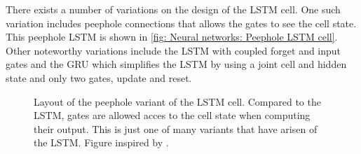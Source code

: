 There exists a number of variations on the design of the \gls{LSTM} cell. One such variation includes peephole connections \cite{Gers2000} that allows the gates to see the cell state. This peephole \gls{LSTM} is shown in \autoref{fig: Neural networks: Peephole LSTM cell}. Other noteworthy variations include the \gls{LSTM} with coupled forget and input gates and the \gls{GRU} \cite{Cho2014a} which simplifies the \gls{LSTM} by using a joint cell and hidden state and only two gates, update and reset.
\begin{figure}[tbp!]
    \centering
    
    \caption{Layout of the peephole variant of the \gls{LSTM} cell. Compared to the \gls{LSTM}, gates are allowed acces to the cell state when computing their output. This is just one of many variants that have arisen of the \gls{LSTM}. Figure inspired by \cite{Olah2015}.}
    \label{fig: Neural networks: Peephole LSTM cell}
\end{figure}
